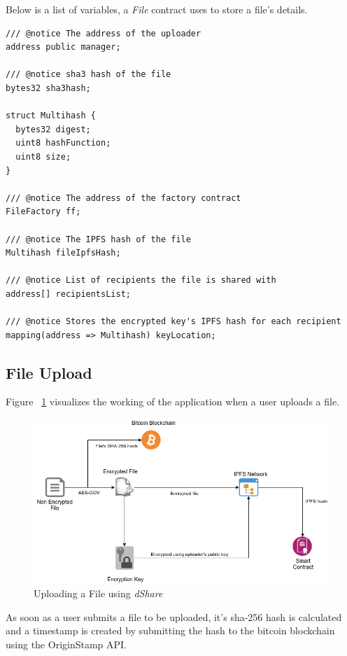\documentclass[]{article}
\begin{document}
		Below is a list of variables, a \textit{File} contract uses to store a file's details.
		
\begin{verbatim}
/// @notice The address of the uploader
address public manager;

/// @notice sha3 hash of the file
bytes32 sha3hash;

struct Multihash {
  bytes32 digest;
  uint8 hashFunction;
  uint8 size;
}

/// @notice The address of the factory contract
FileFactory ff;

/// @notice The IPFS hash of the file
Multihash fileIpfsHash;

/// @notice List of recipients the file is shared with
address[] recipientsList;

/// @notice Stores the encrypted key's IPFS hash for each recipient
mapping(address => Multihash) keyLocation;
\end{verbatim}
		
		\newpage
		\subsection{File Upload}
		Figure ~\ref{fig:upload} visualizes the working of the application when a user uploads a file.
		
		\begin{figure}[h]
			\includegraphics[width=\linewidth]{upload.png}
			\caption{Uploading a File using \textit{dShare}}
			\label{fig:upload}
		\end{figure}
		
		As soon as a user submits a file to be uploaded, it's sha-256 hash is calculated and a timestamp is created by submitting the hash to the bitcoin blockchain using the OriginStamp API.
		
\end{document}
